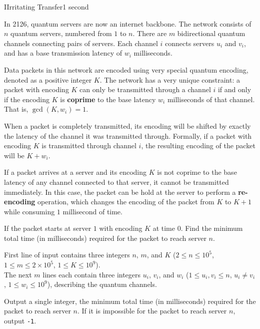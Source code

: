 \begin{problem}{I}{Irritating Transfer}{1 second}

\noindent
In 2126, quantum servers are now an internet backbone. 
The network consists of $n$ quantum servers, numbered from $1$ to $n$.
There are $m$ bidirectional quantum channels connecting pairs of servers.
Each channel $i$ connects servers $u_i$ and $v_i$, and has a base transmission latency of $w_i$ milliseconds.

\noindent
Data packets in this network are encoded using very special quantum encoding, denoted as a positive integer $K$. 
The network has a very unique constraint: a packet with encoding $K$ can only be transmitted through a channel $i$ if and only if the encoding $K$ is \textbf{coprime} to the base latency $w_i$ milliseconds of that channel.
That is, $\gcd(K, w_{i}) = 1$.

\noindent
When a packet is completely transmitted, its encoding will be shifted by exactly the latency of the channel it was transmitted through.
Formally, if a packet with encoding $K$ is transmitted through channel $i$, the resulting encoding of the packet will be $K + w_i$.

\noindent
If a packet arrives at a server and its encoding $K$ is not coprime to the base latency of any channel connected to that server, it cannot be transmitted immediately. 
In this case, the packet can be hold at the server to perform a \textbf{re-encoding} operation, which changes the encoding of the packet from $K$ to $K + 1$ while consuming $1$ millisecond of time.

\noindent
If the packet starts at server $1$ with encoding $K$ at time $0$. Find the minimum total time (in milliseconds) required for the packet to reach server $n$.


\InputFile

\noindent
First line of input contains three integers $n$, $m$, and $K$ ($2 \le n \le 10^5$, $1 \le m \le 2 \times 10^5$, $1 \le K \le 10^9$).\\
The next $m$ lines each contain three integers $u_i$, $v_i$, and $w_i$ ($1 \le u_i, v_i \le n$, $u_i \neq v_i$, $1 \le w_i \le 10^9$), describing the quantum channels. 

\OutputFile

Output a single integer, the minimum total time (in milliseconds) required for the packet to reach server $n$. If it is impossible for the packet to reach server $n$, output \texttt{-1}.

\Examples


\end{problem}
